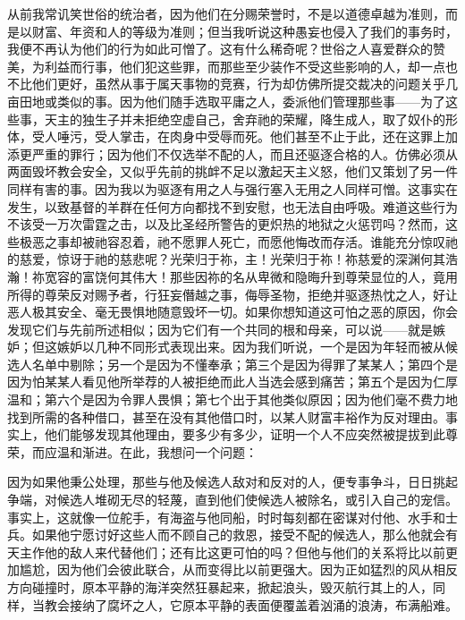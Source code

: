 从前我常讥笑世俗的统治者，因为他们在分赐荣誉时，不是以道德卓越为准则，而是以财富、年资和人的等级为准则；但当我听说这种愚妄也侵入了我们的事务时，我便不再认为他们的行为如此可憎了。这有什么稀奇呢？世俗之人喜爱群众的赞美，为利益而行事，他们犯这些罪，而那些至少装作不受这些影响的人，却一点也不比他们更好，虽然从事于属天事物的竞赛，行为却仿佛所提交裁决的问题关乎几亩田地或类似的事。因为他们随手选取平庸之人，委派他们管理那些事——为了这些事，天主的独生子并未拒绝空虚自己，舍弃祂的荣耀，降生成人，取了奴仆的形体，受人唾污，受人掌击，在肉身中受辱而死。他们甚至不止于此，还在这罪上加添更严重的罪行；因为他们不仅选举不配的人，而且还驱逐合格的人。仿佛必须从两面毁坏教会安全，又似乎先前的挑衅不足以激起天主义怒，他们又策划了另一件同样有害的事。因为我以为驱逐有用之人与强行塞入无用之人同样可憎。这事实在发生，以致基督的羊群在任何方向都找不到安慰，也无法自由呼吸。难道这些行为不该受一万次雷霆之击，以及比圣经所警告的更炽热的地狱之火惩罚吗？然而，这些极恶之事却被祂容忍着，祂不愿罪人死亡，而愿他悔改而存活。谁能充分惊叹祂的慈爱，惊讶于祂的慈悲呢？光荣归于祢，主！光荣归于祢！祢慈爱的深渊何其浩瀚！祢宽容的富饶何其伟大！那些因祢的名从卑微和隐晦升到尊荣显位的人，竟用所得的尊荣反对赐予者，行狂妄僭越之事，侮辱圣物，拒绝并驱逐热忱之人，好让恶人极其安全、毫无畏惧地随意毁坏一切。如果你想知道这可怕之恶的原因，你会发现它们与先前所述相似；因为它们有一个共同的根和母亲，可以说——就是嫉妒；但这嫉妒以几种不同形式表现出来。因为我们听说，一个是因为年轻而被从候选人名单中剔除；另一个是因为不懂奉承；第三个是因为得罪了某某人；第四个是因为怕某某人看见他所举荐的人被拒绝而此人当选会感到痛苦；第五个是因为仁厚温和；第六个是因为令罪人畏惧；第七个出于其他类似原因；因为他们毫不费力地找到所需的各种借口，甚至在没有其他借口时，以某人财富丰裕作为反对理由。事实上，他们能够发现其他理由，要多少有多少，证明一个人不应突然被提拔到此尊荣，而应温和渐进。在此，我想问一个问题：\par

因为如果他秉公处理，那些与他及候选人敌对和反对的人，便专事争斗，日日挑起争端，对候选人堆砌无尽的轻蔑，直到他们使候选人被除名，或引入自己的宠信。事实上，这就像一位舵手，有海盗与他同船，时时每刻都在密谋对付他、水手和士兵。如果他宁愿讨好这些人而不顾自己的救恩，接受不配的候选人，那么他就会有天主作他的敌人来代替他们；还有比这更可怕的吗？但他与他们的关系将比以前更加尴尬，因为他们会彼此联合，从而变得比以前更强大。因为正如猛烈的风从相反方向碰撞时，原本平静的海洋突然狂暴起来，掀起浪头，毁灭航行其上的人，同样，当教会接纳了腐坏之人，它原本平静的表面便覆盖着汹涌的浪涛，布满船难。\par

